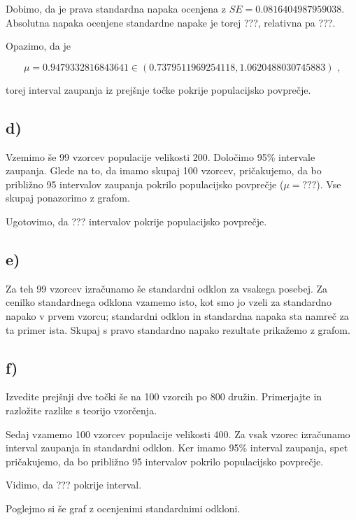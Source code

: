 \documentclass[12pt, a4paper]{article}
\begin{document}
Dobimo, da je prava standardna napaka ocenjena z $SE = 0.0816404987959038$. Absolutna
napaka ocenjene standardne napake je torej ???, relativna pa ???.

Opazimo, da je

$$ \mu = 0.9479332816843641 \in (0.7379511969254118, 1.0620488030745883) \text{ ,}
$$

torej interval zaupanja iz prejšnje točke pokrije populacijsko povprečje.

\subsection{d)}

Vzemimo še 99 vzorcev populacije velikosti 200. Določimo 95\% intervale zaupanja. 
Glede na to, da imamo skupaj 100
vzorcev, pričakujemo, da bo približno 95 intervalov zaupanja pokrilo populacijsko
povprečje ($\mu = ???$). Vse skupaj ponazorimo z grafom.


Ugotovimo, da ??? intervalov pokrije populacijsko povprečje.

\subsection{e)}

Za teh 99 vzorcev izračunamo še standardni odklon za vsakega posebej. 
Za cenilko standardnega odklona vzamemo isto, kot smo jo vzeli za standardno 
napako v prvem vzorcu; standardni odklon in standardna napaka sta namreč za ta
primer ista. Skupaj s pravo standardno napako rezultate prikažemo z grafom.




\subsection{f)}
Izvedite prejšnji dve točki še na 100 vzorcih po 800 družin. Primerjajte 
in razložite razlike s teorijo vzorčenja.

Sedaj vzamemo 100 vzorcev populacije velikosti 400. Za vsak vzorec izračunamo
interval zaupanja in standardni odklon. Ker imamo 95\% interval zaupanja, spet
pričakujemo, da bo približno 95 intervalov pokrilo populacijsko povprečje.


Vidimo, da ??? pokrije interval.

Poglejmo si še graf z ocenjenimi standardnimi odkloni.
\end{document}

